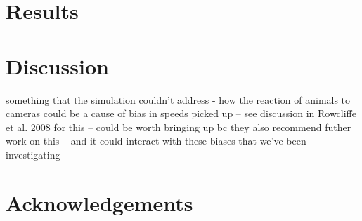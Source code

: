 \documentclass[a4paper,12pt,twoside]{report}
\begin{document}
	
	
	
	\section{Results}
	
	
	
	\newpage
	
	\section{Discussion}
	
	
	something that the simulation couldn't address - how the reaction of animals to cameras could be a cause of bias in speeds picked up -- see discussion in Rowcliffe et al. 2008 for this -- could be worth bringing up bc they also recommend futher work on this -- and it could interact with these biases that we've been investigating 
	
	
	

	\section{Acknowledgements}

	
	
	
\end{document}
